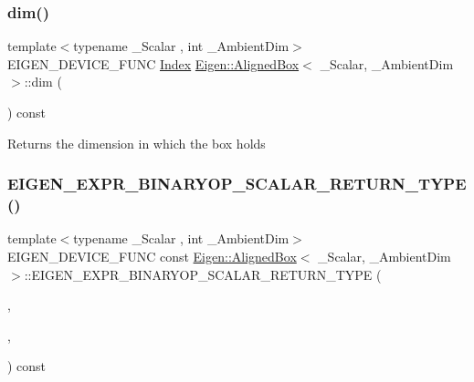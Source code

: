 \subsubsection{\texorpdfstring{dim()}{dim()}}
{\footnotesize\ttfamily template$<$typename \+\_\+\+Scalar , int \+\_\+\+Ambient\+Dim$>$ \\
E\+I\+G\+E\+N\+\_\+\+D\+E\+V\+I\+C\+E\+\_\+\+F\+U\+NC \mbox{\hyperlink{class_eigen_1_1_aligned_box_a774ef355da13d6bee6a6e7244c15231a}{Index}} \mbox{\hyperlink{class_eigen_1_1_aligned_box}{Eigen\+::\+Aligned\+Box}}$<$ \+\_\+\+Scalar, \+\_\+\+Ambient\+Dim $>$\+::dim (\begin{DoxyParamCaption}{ }\end{DoxyParamCaption}) const\hspace{0.3cm}{\ttfamily [inline]}}

\begin{DoxyReturn}{Returns}
the dimension in which the box holds 
\end{DoxyReturn}
\mbox{\label{class_eigen_1_1_aligned_box_a53e595641b2d163739098a1983db5414}} 
\subsubsection{\texorpdfstring{EIGEN\_EXPR\_BINARYOP\_SCALAR\_RETURN\_TYPE()}{EIGEN\_EXPR\_BINARYOP\_SCALAR\_RETURN\_TYPE()}}
{\footnotesize\ttfamily template$<$typename \+\_\+\+Scalar , int \+\_\+\+Ambient\+Dim$>$ \\
E\+I\+G\+E\+N\+\_\+\+D\+E\+V\+I\+C\+E\+\_\+\+F\+U\+NC const \mbox{\hyperlink{class_eigen_1_1_aligned_box}{Eigen\+::\+Aligned\+Box}}$<$ \+\_\+\+Scalar, \+\_\+\+Ambient\+Dim $>$\+::E\+I\+G\+E\+N\+\_\+\+E\+X\+P\+R\+\_\+\+B\+I\+N\+A\+R\+Y\+O\+P\+\_\+\+S\+C\+A\+L\+A\+R\+\_\+\+R\+E\+T\+U\+R\+N\+\_\+\+T\+Y\+PE (\begin{DoxyParamCaption}\item[{\mbox{\hyperlink{class_eigen_1_1_cwise_binary_op}{Vector\+Type\+Sum}}}]{,  }\item[{Real\+Scalar}]{,  }\item[{quotient}]{ }\end{DoxyParamCaption}) const\hspace{0.3cm}{\ttfamily [inline]}}

